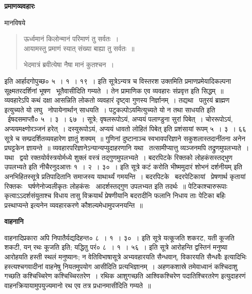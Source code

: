 \documentclass[11pt, openany]{book}
\begin{document}
\begin{center}
\textbf{\Large प्रमाणव्यवहारः \textendash\ }
\end{center}

मानविषये \textendash\ 

\begin{quote}
{\qt ऊर्ध्वमानं किलोन्मानं परिमाणं तु सर्वतः~।\\
आयामस्तु प्रमाणं स्यात् संख्या बाह्या तु सर्वतः~॥

भेदमात्रं ब्रवीत्येषा नैषा मानं कुतश्चन~।}
\end{quote}

इति आर्हादगोपुच्छ० ५~। १~। १९~। इति सूत्रेऽन्यत्र च विस्तरश उक्तमिति प्रमाणप्रमेयादिकल्पना सूक्ष्मतरदर्शिनां भूषण \textendash\ भूतैवासीदिति गम्यते~। तेन प्रामाणिक एव व्यवहारः संप्रवृत्त इति सिद्धम्~॥\\

व्यवहारेऽपि कथं दक्षा आसन्निति {\qt लोकतो व्यवहारं दृष्ट्वा गुणस्य निर्ज्ञानम्~। तद्यथा \textendash\ पतुरयं ब्राह्मण इत्युच्यते यो लघु \textendash\ नोपायेनार्थान् साधयति~। पटुकल्पोऽयमित्युच्यते यो न तथा साधयति} इति \textendash\ ईषदसमाप्तौ० ५~। ३~। ६७~। सूत्रे; वृषलरूपोऽयं, अप्ययं पलाण्डुना सुरां पिबेत्~। चोररूपोऽयं, अप्ययमक्ष्णोरञ्जनं हरेत्~। दस्युरूपोऽयं, अप्ययं धावतो लोहितं पिबेत् इति प्रशंसायां रूपम् ५~। ३~। ६६ सूत्रे च सम्प्रदर्शितव्यवहारेण ज्ञातुं शक्यम्~॥ गुणिनां दुष्टानाञ्च स्वभावपरिज्ञाने सकुशलास्तदानींतना अनेन प्रघट्टकेन ज्ञायन्ते~॥ व्यवहारपरिज्ञानेऽन्यान्यप्युदाहरणानि यथा \textendash\ {\qt तत्सामीप्यात्तु व्यञ्जनमपि तद्रुणमुपलभ्यते~। यथा \textendash\ द्वयो रक्तयोर्वस्त्रयोर्मध्ये शुक्लं वस्त्रं तद्गुणमुपलभ्यते~। बदरपिटके रिक्तको लोहकंसस्तद्भुण उपलभ्यते} इति नीचैरनुदआत्तः १~। २~। ३०~। इति सूत्रे {\qt कटं करोति भीष्ममुदारं शोभनं दर्शनीयम्} इति अनभिहितस्सूत्रे प्रतिपादितानि समाजस्य याथार्थ्यं गमयन्ति~। बदरपिटके \textendash\ बदरपेटिकायां \textendash\ प्रेषणार्थ कृतायां रिक्तकः \textendash\ घर्षणेनोज्वलीकृतः लोहकंसः \textendash\ आदर्शस्तद्गुण उपलभ्यत इति तदर्थः~॥ पेटिकाश्चारुरूपाः कृत्वाऽऽदर्शसंयुताश्च विधाय तासु विक्रयार्थं प्रेषणीयानि बदरादीनि फलानि निधाय ताः पेटिका बहिः प्रस्थाप्यन्ते इत्यनेन व्यवहारकरणे कौशल्यमेधामुपजनयन्ति~॥

\begin{center}
\textbf{\Large वाहनानि \textendash\ }
\end{center}

वाहनादिप्रकारा अपि निपातैर्यद्यदिहन्त० ८~। १~। ३०~। इति सूत्रे यत्कूजति शकरट, यती कूजति शकटी, यन् रथः कूजति इति; यद्धितु परं० ८~। १~। ५६~। इति सूत्रे {\qt आरोहन्ति द्वस्तिनं मनुष्या आरोहयति हस्ती स्थलं मनुष्यानः; न वेतिविभाषासूत्रे }अभ्यवहारयति सैन्धवान्, विकारयति सैन्धवैः इत्यादिभिः हस्त्यश्चगवादीनां वाहनेषु नियतमुपयोग आसीदिति प्रत्यभिज्ञानम्~। अहणकशास्रे {\qt तमेवाध्वानं कश्चिदाशु गच्छति कश्चिच्चिरेण कश्चिच्चिरतरेण~। रथिक आशुगच्छति आश्विकश्चिरेण पदातिश्चिरतरेण} इत्युदाहरणं वाहनक्रियायामुपयुज्यमानो रथ एव तत्र प्रधानमासीदिति गम्यते~॥\\
\end{document}
